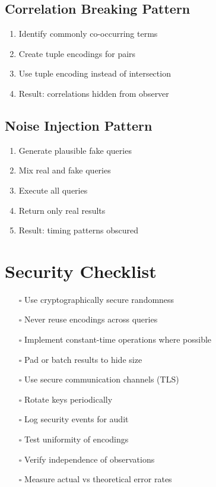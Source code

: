 \subsection{Correlation Breaking Pattern}
\begin{enumerate}
\item Identify commonly co-occurring terms
\item Create tuple encodings for pairs
\item Use tuple encoding instead of intersection
\item Result: correlations hidden from observer
\end{enumerate}

\subsection{Noise Injection Pattern}
\begin{enumerate}
\item Generate plausible fake queries
\item Mix real and fake queries
\item Execute all queries
\item Return only real results
\item Result: timing patterns obscured
\end{enumerate}

\section{Security Checklist}

\begin{itemize}
\item[$\square$] Use cryptographically secure randomness
\item[$\square$] Never reuse encodings across queries
\item[$\square$] Implement constant-time operations where possible
\item[$\square$] Pad or batch results to hide size
\item[$\square$] Use secure communication channels (TLS)
\item[$\square$] Rotate keys periodically
\item[$\square$] Log security events for audit
\item[$\square$] Test uniformity of encodings
\item[$\square$] Verify independence of observations
\item[$\square$] Measure actual vs theoretical error rates
\end{itemize}

